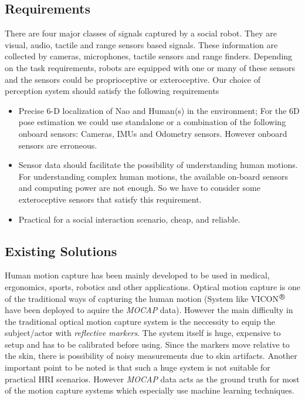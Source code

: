 \subsection{Requirements}
	There are four major classes of signals captured by a social robot. They are visual, audio, tactile and range sensors based signals. These information are collected by cameras, microphones, tactile sensors and range finders\cite{Yan2014}. Depending on the task requirements, robots are equipped with one or many of these sensors and the sensors could be proprioceptive or exteroceptive. 
Our choice of perception system should satisfy the following requirements
\begin{itemize}
\item Precise 6-D localization of Nao and Human(s) in the environment; For the 6D pose estimation we could use standalone or a combination of the following onboard sensors: Cameras, IMUs and Odometry sensors. However onboard sensors are erroneous.
\item Sensor data should facilitate the possibility of understanding human motions. For understanding complex human motions, the available on-board sensors and computing power are not enough. So we have to consider some exteroceptive sensors that satisfy this requirement. 
\item Practical for a social interaction scenario, cheap, and reliable.
\end{itemize}
\subsection{Existing Solutions}
	Human motion capture has been mainly developed to be used in medical, ergonomics, sports, robotics and other applications. Optical motion capture is one of the traditional ways of capturing the human motion (System like VICON$^{\regmark}$ have been deployed to aquire the \emph{MOCAP} data). However the main difficulty in the traditional optical motion capture system is the neccessity to equip the subject/actor with \emph{reflective markers}. The system itself is huge, expensive to setup and has to be calibrated before using. Since the markers move relative to the skin, there is possibility of noisy measurements due to skin artifacts. Another important point to be noted is that such a huge system is not suitable for practical HRI scenarios. However \emph{MOCAP} data acts as the ground truth for most of the motion capture systems which especially use machine learning techniques.
	
